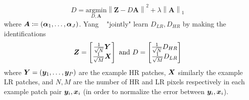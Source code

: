 \begin{equation}
    \hat{D} = \underset{D, \bm{A}}{\text{argmin}} \left\| \bm{Z} - D\bm{A} \right\|^2 + \lambda \left\| \bm{A} \right\|_1
\end{equation}
where $\bm{A} \coloneqq \left( \bm{\alpha}_1, \mathellipsis, \bm{\alpha}_J  \right)$.
%
Yang \etal~ "jointly" learn $D_{LR}, D_{HR}$ by making the identifications
\begin{equation*}
    \bm{Z} = \begin{bmatrix}
                 \frac{1}{\sqrt{N}}\bm{Y} \\ \frac{1}{\sqrt{M}} \bm{X}
    \end{bmatrix} \text{ and }
    D = \begin{bmatrix}
            \frac{1}{\sqrt{N}} D_{HR} \\ \frac{1}{\sqrt{M}} D_{LR}
    \end{bmatrix}
\end{equation*}
where $\bm{Y} = \left( \bm{y}_1, \mathellipsis, \bm{y}_P \right)$ are the example HR patches, $\bm{X}$ similarly the example LR patches, and $N, M$ are the number of HR and LR pixels respectively in each example patch pair $\bm{y}_i, \bm{x}_i$ (in order to normalize the error between $\bm{y}_i, \bm{x}_i$).
